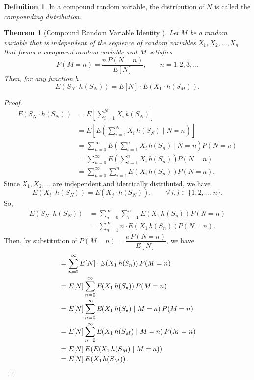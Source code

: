 \documentclass[11pt]{amsart}
\theoremstyle{definition}
\newtheorem{definition}{Definition}
\theoremstyle{plain}
\newtheorem{theorem}{Theorem}
\begin{document}
\begin{definition}
In a compound random variable, the distribution of $N$ is called the \emph{compounding
distribution}.
\end{definition}



\begin{theorem}[Compound Random Variable Identity {\cite{ross2010, pekoz-ross}}]
Let $M$ be a random variable that is independent of the sequence of random variables
$X_1, X_2, \ldots, X_n$ that forms a compound random variable and $M$ satisfies
\[
    P(M = n) = \frac{n\, P(N = n)}{E[N]}, \qquad n = 1, 2, 3, \ldots
\]
Then, for any function $h$,
\[
    E\!\left(S_N \cdot h(S_N)\right) = E[N] \cdot E\!\left(X_1 \cdot h(S_M)\right).
\]
\end{theorem}

\begin{proof}
\begin{align*}
E\!\left(S_N \cdot h(S_N)\right)
    &= E\!\left[\sum_{i=1}^{N} X_i\, h(S_N)\right] \\
    &= E\!\left[E\!\left(\sum_{i=1}^{N} X_i\, h(S_N) \;\Bigg|\; N = n\right)\right] \\
    &= \sum_{n=0}^{\infty} E\!\left(\sum_{i=1}^{n} X_i\, h(S_n) \;\Bigg|\; N = n\right)
       P(N = n) \\
    &= \sum_{n=0}^{\infty} E\!\left(\sum_{i=1}^{n} X_i\, h(S_n)\right) P(N = n) \\
    &= \sum_{n=0}^{\infty} \sum_{i=1}^{n} E\!\left(X_i\, h(S_n)\right) P(N = n).
\end{align*}
Since $X_1, X_2, \ldots$ are independent and identically distributed, we have
\[
    E\!\left(X_i \cdot h(S_N)\right) = E\!\left(X_j \cdot h(S_N)\right),
    \qquad \forall\, i, j \in \{1, 2, \ldots, n\}.
\]
So,
\begin{align*}
E\!\left(S_N \cdot h(S_N)\right)
    &= \sum_{n=0}^{\infty} \sum_{i=1}^{n} E\!\left(X_1\, h(S_n)\right) P(N = n) \\
    &= \sum_{n=1}^{\infty} n \cdot E\!\left(X_1\, h(S_n)\right) P(N = n).
\end{align*}
Then, by substitution of $P(M = n) = \dfrac{n\,P(N=n)}{E[N]}$, we have
\begin{align*}
    &= \sum_{n=0}^{\infty} E[N] \cdot E\!\left(X_1\, h(S_n)\right) P(M = n) \\
    &= E[N] \sum_{n=0}^{\infty} E\!\left(X_1\, h(S_n)\right) P(M = n) \\
    &= E[N] \sum_{n=0}^{\infty} E\!\left(X_1\, h(S_n) \mid M = n\right) P(M = n) \\
    &= E[N] \sum_{n=0}^{\infty} E\!\left(X_1\, h(S_M) \mid M = n\right) P(M = n) \\
    &= E[N]\, E\!\left(E\!\left(X_1\, h(S_M) \mid M = n\right)\right) \\
    &= E[N]\, E\!\left(X_1\, h(S_M)\right). \qedhere
\end{align*}
\end{proof}
\end{document}

